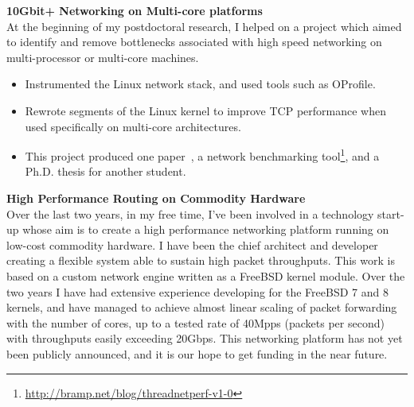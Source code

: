 \documentclass[a4paper,10pt]{article}
\begin{document}
\textbf{10Gbit+ Networking on Multi-core platforms}\\
 At the beginning of my postdoctoral research, I helped on a project which aimed to identify and remove bottlenecks associated with high speed networking on multi-processor or multi-core machines.

\begin{itemize}
 \item Instrumented the Linux network stack, and used tools such as OProfile.
 \item Rewrote segments of the Linux kernel to improve TCP performance when used specifically on multi-core architectures.
 \item This project produced one paper~\cite{faulkner2009epn}, a network benchmarking tool\footnote{\href{http://bramp.net/blog/threadnetperf-v1-0}{http://bramp.net/blog/threadnetperf-v1-0}}, and a Ph.D. thesis for another student.
\end{itemize}
\vspace{1em}

\textbf{High Performance Routing on Commodity Hardware}\\
 Over the last two years, in my free time, I've been involved in a technology start-up whose aim is to create a high performance networking platform running on low-cost commodity hardware. I have been the chief architect and developer creating a flexible system able to sustain high packet throughputs. This work is based on a custom network engine written as a FreeBSD kernel module. Over the two years I have had extensive experience developing for the FreeBSD 7 and 8 kernels, and have managed to achieve almost linear scaling of packet forwarding with the number of cores, up to a tested rate of 40Mpps (packets per second) with throughputs easily exceeding 20Gbps. This networking platform has not yet been publicly announced, and it is our hope to get funding in the near future.
\vspace{1em}
\end{document}
